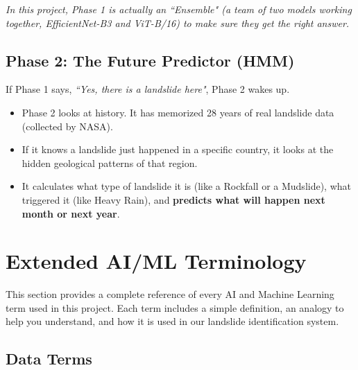 \documentclass[11pt]{article}
\begin{document}
\textit{In this project, Phase 1 is actually an ``Ensemble" (a team of two models working together, EfficientNet-B3 and ViT-B/16) to make sure they get the right answer.}

\subsection{Phase 2: The Future Predictor (HMM)}
If Phase 1 says, \textit{``Yes, there is a landslide here"}, Phase 2 wakes up.
\begin{itemize}
    \item Phase 2 looks at history. It has memorized 28 years of real landslide data (collected by NASA).
    \item If it knows a landslide just happened in a specific country, it looks at the hidden geological patterns of that region.
    \item It calculates what type of landslide it is (like a Rockfall or a Mudslide), what triggered it (like Heavy Rain), and \textbf{predicts what will happen next month or next year}.
\end{itemize}

\section{Extended AI/ML Terminology}
This section provides a complete reference of every AI and Machine Learning term used in this project. Each term includes a simple definition, an analogy to help you understand, and how it is used in our landslide identification system.

\subsection{Data Terms}
\end{document}
